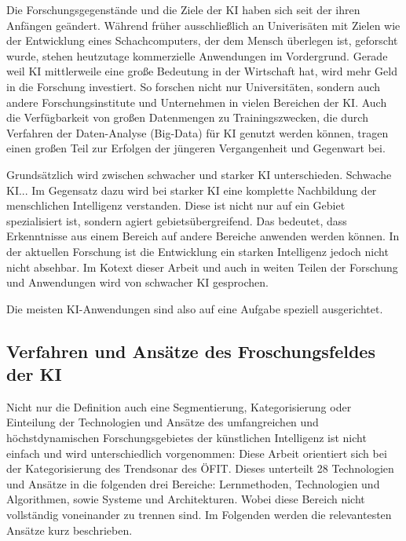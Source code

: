 \documentclass[a4paper,12pt, german]{report}
\begin{document}
Die Forschungsgegenstände und die Ziele der KI haben sich seit der ihren Anfängen geändert. Während früher ausschließlich an Univerisäten mit Zielen wie der Entwicklung eines Schachcomputers, der dem Mensch überlegen ist, geforscht wurde, stehen heutzutage kommerzielle Anwendungen im Vordergrund. 
Gerade weil KI mittlerweile eine große Bedeutung in der Wirtschaft hat, wird mehr Geld in die Forschung investiert. So forschen nicht nur Universitäten, sondern auch andere Forschungsinstitute und Unternehmen in vielen Bereichen der KI. Auch die Verfügbarkeit von großen Datenmengen zu Trainingszwecken, die durch Verfahren der Daten-Analyse (Big-Data) für KI genutzt werden können, tragen einen großen Teil zur Erfolgen der jüngeren Vergangenheit und Gegenwart bei. 

Grundsätzlich wird zwischen schwacher und starker KI unterschieden. Schwache KI... 
Im Gegensatz dazu wird bei starker KI eine komplette Nachbildung der menschlichen Intelligenz verstanden. Diese ist nicht nur auf ein Gebiet spezialisiert ist, sondern agiert gebietsübergreifend. Das bedeutet, dass Erkenntnisse aus einem Bereich auf andere Bereiche anwenden werden können. In der aktuellen Forschung ist die Entwicklung ein starken Intelligenz jedoch nicht nicht absehbar. 
Im Kotext dieser Arbeit und auch in weiten Teilen der Forschung und Anwendungen wird von schwacher KI gesprochen.

Die meisten KI-Anwendungen sind also auf eine Aufgabe speziell ausgerichtet. 

\subsection{Verfahren und Ansätze des Froschungsfeldes der KI}

Nicht nur die Definition auch eine Segmentierung, Kategorisierung oder Einteilung der Technologien und Ansätze des umfangreichen und höchstdynamischen Forschungsgebietes der künstlichen Intelligenz ist nicht einfach und wird unterschiedlich vorgenommen:
Diese Arbeit orientiert sich bei der Kategorisierung des Trendsonar des ÖFIT. Dieses unterteilt 28 Technologien und Ansätze in die folgenden drei Bereiche: Lernmethoden, Technologien und Algorithmen, sowie Systeme und Architekturen. Wobei diese Bereich nicht vollständig voneinander zu trennen sind. Im Folgenden werden die relevantesten Ansätze kurz beschrieben. 
\end{document}
